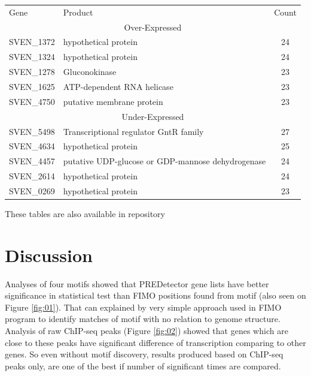 \documentclass{bioinfo}
\begin{document}
\begin{methods}
\begin{table}[!t]
 {
\begin{tabular}{ l | p{5cm} | c }
\hline
Gene    & Product & Count \\
\cline{1-3}
\multicolumn{3}{c}{Over-Expressed}  \\
\hline
SVEN\_1372 & hypothetical protein & 24   \\
SVEN\_1324 & hypothetical protein    & 24   \\
SVEN\_1278 & Gluconokinase    & 23     \\
SVEN\_1625 & ATP-dependent RNA helicase    & 23    \\
SVEN\_4750 & putative membrane protein & 23 \\
\cline{1-3}
\multicolumn{3}{c}{Under-Expressed} \\
\cline{1-3}
SVEN\_5498 & Transcriptional regulator GntR family & 27  \\
SVEN\_4634 & hypothetical protein & 25  \\
SVEN\_4457 & putative UDP-glucose or GDP-mannose dehydrogenase & 24 \\
SVEN\_2614 & hypothetical protein & 24  \\
SVEN\_0269 & hypothetical protein & 23 \\
\hline
\end{tabular}}{These tables are also available in repository}
\end{table}


\end{methods}



\section{Discussion}

Analyses of four motifs showed that PREDetector gene lists have better significance in statistical test than FIMO positions found from motif (also seen on Figure \ref{fig:01}). That can explained by very simple approach used in FIMO program to identify matches of motif with no relation to genome structure.\\
Analysis of raw ChIP-seq peaks (Figure \ref{fig:02}) showed that genes which are close to these peaks have significant difference of transcription comparing to other genes. So even without motif discovery, results produced based on ChIP-seq peaks only, are one of the best if number of significant times are compared.
\end{document}
